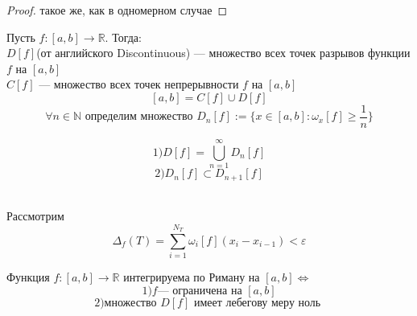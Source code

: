 \documentclass[11pt]{article}
\begin{document}
\begin{proof}
    такое же, как в одномерном случае
\end{proof}


\begin{definition}
    Пусть $f: [a,b] \to \mathbb{R} $. Тогда: \\
    $ D [f] $(от английского Discontinuous) --- множество всех точек разрывов функции $f$ на $[a,b]$\\
    $ C[f]$ --- множество всех точек непрерывности $f$ на $[a,b]$\\
    \[ [a,b] = C[f] \cup D[f] \]
    \[ \forall n\in \mathbb{N} \text{  определим множество } D_n[f] := \{ x\in [a,b] : \omega_x [f] \geq \frac{1}{n} \} \]
\end{definition}

\begin{lemma}
    \[ 1) D[f] = \bigcup_{n=1}^{\infty} D_n[f] \]
    \[ 2) D_n[f] \subset D_{n+1} [f] \]
\end{lemma} \leavevmode
\\
Рассмотрим \[ \Delta_f (T) = \sum _{i=1}^{N_T} \omega_i [f] (x_i-x_{i-1}) < \varepsilon \]

\begin{theorem}
     Функция $f: [a,b]\to \mathbb{R}$ интегрируема по Риману на $[a,b] \iff $
    \[ 1) f \text{--- ограничена на  } [a,b] \]
    \[ 2) \text{множество } D[f] \text{  имеет лебегову меру ноль }\]
\end{theorem}
\end{document}
